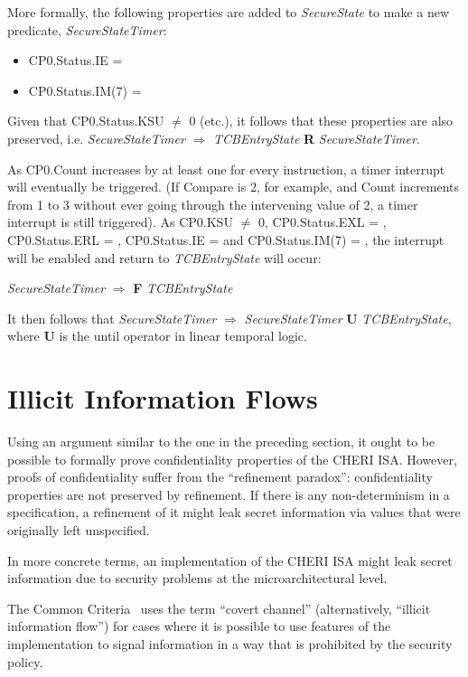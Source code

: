 More formally, the following properties are added to \emph{SecureState}
to make a new predicate, \emph{SecureStateTimer}:

\begin{itemize}
\item
CP0.Status.IE = \algorithmictrue{}
\item
CP0.Status.IM(7) = \algorithmictrue{}
\end{itemize}

Given that CP0.Status.KSU $\neq$ 0 (etc.),  it follows that these properties
are also preserved, i.e.
\emph{SecureStateTimer} $\Rightarrow$ \emph{TCBEntryState} \textbf{R}
\emph{SecureStateTimer}.

As CP0.Count increases by at least one for every instruction, a timer interrupt
will eventually be triggered. (If Compare is 2, for example, and Count
increments from 1 to 3 without ever going through the intervening value of 2,
a timer interrupt is still triggered). As CP0.KSU $\neq$ 0, CP0.Status.EXL
= \algorithmicfalse{}, CP0.Status.ERL = \algorithmicfalse{}, CP0.Status.IE =
\algorithmictrue{} and CP0.Status.IM(7) = \algorithmictrue{}, the interrupt
will be enabled and return to \emph{TCBEntryState} will occur:

\emph{SecureStateTimer} $\Rightarrow$ \textbf{F} \emph{TCBEntryState}

It then follows that \emph{SecureStateTimer} $\Rightarrow$
\emph{SecureStateTimer} \textbf{U} \emph{TCBEntryState}, where
\textbf{U} is the until operator in linear temporal logic.

\section*{Illicit Information Flows}

Using an argument similar to the one in the preceding section, it ought
to be possible to formally prove confidentiality properties of the CHERI ISA.
However, proofs of confidentiality suffer from the ``refinement paradox'':
confidentiality properties are not preserved by refinement. If there is
any non-determinism in a specification, a refinement of it might leak
secret information via values that were originally left unspecified.

In more concrete terms, an implementation of the CHERI ISA might leak secret
information due to security problems at the microarchitectural level.

The Common Criteria~\cite{CC2017-1} uses the term ``covert channel'' (alternatively,
``illicit information flow'') for cases where it is possible to use
features of the implementation to signal information in a way that is
prohibited by the security policy.

